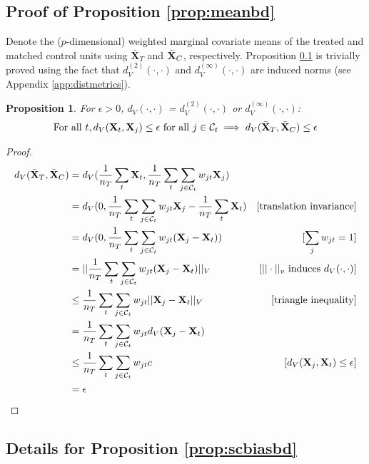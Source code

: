 \documentclass{article}
\newtheorem{proposition}[theorem]{Proposition}
\newcommand{\bX}{\mathbf{X}}
\newcommand{\Xt}{\mathbf{X}_t}
\newcommand{\Xj}{\mathbf{X}_j}
\newcommand{\Ct}{\mathcal{C}_{t}}
\begin{document}
\subsection{Proof of Proposition \ref{prop:meanbd}}
\label{app:meanbd}

Denote the ($p$-dimensional) weighted marginal covariate means of the treated and matched control units using $\bar{\bX}_T$ and $\Bar{\bX}_C$, respectively.
Proposition \ref{app:meanbd} is trivially proved using the fact that $d^{(2)}_V(\cdot, \cdot)$ and $d^{(\infty)}_V(\cdot, \cdot)$ are induced norms (see Appendix \ref{app:distmetrics}).
\begin{proposition}
\label{prop:meanbd_app}
    For $\epsilon > 0$, $d_V(\cdot, \cdot)$ = $d^{(2)}_V(\cdot, \cdot)$ or $d^{(\infty)}_V(\cdot, \cdot)$:
    \begin{align*}
        \text{For all } t, d_V(\Xt, \Xj) \leq \epsilon \text{ for all } j \in \Ct
        \implies d_V(\bar{\bX}_T, \Bar{\bX}_C) \leq \epsilon
    \end{align*}
\end{proposition}
\begin{proof}
    \begin{align*}
        d_V(\bar{\bX}_T, \Bar{\bX}_C)
        &= d_V(\frac{1}{n_T} \sum_t \bX_t, \frac{1}{n_T} \sum_t \sum_{j \in \Ct} w_{jt} \bX_j) \\
        &= d_V(0, \frac{1}{n_T} \sum_t \sum_{j \in \Ct} w_{jt} \bX_j - \frac{1}{n_T} \sum_t \bX_t) &\text{[translation invariance]} \\
        &= d_V(0, \frac{1}{n_T} \sum_t \sum_{j \in \Ct} w_{jt} (\bX_j - \bX_t)) &[\sum_j w_{jt}=1] \\
        &= ||\frac{1}{n_T} \sum_t \sum_{j \in \Ct} w_{jt} (\bX_j - \bX_t)||_V &[||\cdot||_v \text{ induces } d_V(\cdot, \cdot)] \\
        &\leq \frac{1}{n_T} \sum_t \sum_{j \in \Ct} w_{jt} 
            ||\bX_j - \bX_t||_V &[\text{triangle inequality}] \\
        &= \frac{1}{n_T} \sum_t \sum_{j \in \Ct} w_{jt}
            d_V(\bX_j - \bX_t) \\
        &\leq \frac{1}{n_T} \sum_t \sum_{j \in \Ct} w_{jt} c & [d_V(\bX_j, \bX_t) \leq \epsilon] \\
        &= \epsilon
    \end{align*}
\end{proof}

\subsection{Details for Proposition \ref{prop:scbiasbd}}
\label{app:scbiasbd}
\end{document}
